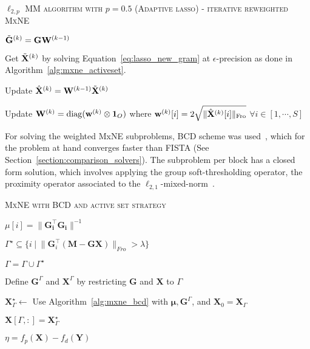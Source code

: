 {\fontsize{4}{4}\selectfont
\begin{algorithm}[t]
\caption{\textsc{$\ell_{2,p}$ MM algorithm with $p=0.5$ (Adaptive \ac{lasso}) - iterative reweighted MxNE}}
    {
		$\tilde{\mathbf{G}}^{(k)} = \mathbf{G} \mathbf{W}^{(k-1)}$

		Get $\tilde{\mathbf{X}}^{(k)}$ by solving Equation~\eqref{eq:lasso_new_gram} at $\epsilon$-precision as done in Algorithm~\ref{alg:mxne_activeset}.

		Update $\hat{\mathbf{X}}^{(k)} = \mathbf{W}^{(k-1)} \tilde{\mathbf{X}}^{(k)}$

	    Update $\mathbf{W}^{(k)}=\mathrm{diag}(\mathbf{w}^{(k)} \otimes \mathbf{1}_{O})$ where $\mathbf{w}^{(k)}[i] = 2 \sqrt{\|{\hat{\mathbf{X}}^{(k)}[i]}\|_{\rm Fro}}$  $\forall i\in [1, \cdots, S]$


     }
\label{alg:adpative_lasso}
\end{algorithm}
}

For solving the weighted MxNE subproblems, \ac{BCD} scheme was used~\cite{tseng}, which for the problem at hand converges faster than \ac{FISTA} (See Section~\ref{section:comparison_solvers}). The subproblem per block has a closed form solution, which involves applying the group soft-thresholding operator, the proximity operator associated to the $\ell_{2,1}$-mixed-norm~\cite{gramfort2012mixed,strohmeier-etal:16}.

{\fontsize{4}{4}\selectfont
\begin{algorithm}[t]
\caption{\textsc{MxNE with BCD and active set strategy}}
    {
		$\mu[i] = \|\mathbf{G^\top_i\mathbf{G}_i}\|^{-1}$
     }
\While{
		$\eta \geq \epsilon$
	  }
	  {
	  	$\Gamma^\star\subseteq \{i \hspace{3pt} | \hspace{3pt} \|\mathbf{G}_i^\top(\mathbf{M}-\mathbf{GX})\|_{Fro} > \lambda\}$

	  	$\Gamma = \Gamma\cup \Gamma^\star$

	  	Define $\mathbf{G}^\Gamma$ and $\mathbf{X}^\Gamma$ by restricting $\mathbf{G}$ and $\mathbf{X}$ to $\Gamma$

	  	$\mathbf{X}^{\star}_\Gamma \leftarrow$ Use Algorithm~\ref{alg:mxne_bcd} with $\mathbf{\mu}, \mathbf{G}^\Gamma$, and $\mathbf{X}_0=\mathbf{X}_\Gamma$

	  	$\mathbf{X}[\Gamma, :] = \mathbf{X}^{\star}_\Gamma$

	  	$\eta=f_p(\mathbf{X})-f_d(\mathbf{Y})$
	  }
\label{alg:mxne_activeset}
\end{algorithm}
}

